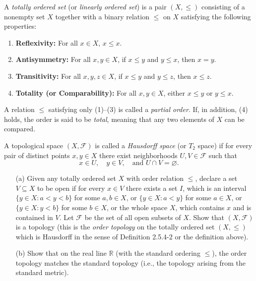 \begin{problem}[20pts]
    \vphantom{text}
    \begin{definition}\label{def:total-order}
A \emph{totally ordered set} (or \emph{linearly ordered set}) is a pair $(X, \leq)$ consisting of a nonempty set $X$ together with a binary relation $\leq$ on $X$ satisfying the following properties:
\begin{enumerate}
    \item \textbf{Reflexivity:} For all $x \in X$, $x \leq x$.
    \item \textbf{Antisymmetry:} For all $x, y \in X$, if $x \leq y$ and $y \leq x$, then $x = y$.
    \item \textbf{Transitivity:} For all $x, y, z \in X$, if $x \leq y$ and $y \leq z$, then $x \leq z$.
    \item \textbf{Totality (or Comparability):} For all $x, y \in X$, either $x \leq y$ or $y \leq x$.
\end{enumerate}
A relation $\leq$ satisfying only (1)--(3) is called a \emph{partial order}.  
If, in addition, (4) holds, the order is said to be \emph{total}, meaning that any two elements of $X$ can be compared.
\end{definition}


\begin{definition}
A topological space $(X,\mathcal{F})$ is called a \emph{Hausdorff space} (or $T_2$ space) if for every pair of distinct points $x,y \in X$ there exist neighborhoods 
$U,V \in \mathcal{F}$ such that
\[
x \in U, \quad y \in V, \quad \text{and } U \cap V = \varnothing.
\]
\end{definition}
  \begin{enumerate}
  \item[(a)] Given any totally ordered set $X$ with order relation $\le$, declare a set $V \subseteq X$ to be open if for every $x \in V$ there exists a set $I$, which is an interval  
$\{y \in X : a < y < b\}$ for some $a, b \in X$, or  
$\{y \in X : a < y\}$ for some $a \in X$, or  
$\{y \in X : y < b\}$ for some $b \in X$, or the whole space $X$, which contains $x$ and is contained in $V$.  
Let $\mathcal{F}$ be the set of all open subsets of $X$.  
Show that $(X, \mathcal{F})$ is a topology (this is the \emph{order topology} on the totally ordered set $(X, \le)$ which is Hausdorff in the sense of  Definition 2.5.4-2 or the definition above).  


\medskip
\item[(b)] 
Show that on the real line $\mathbb{R}$ (with the standard ordering $\le$), the order topology matches the standard topology (i.e., the topology arising from the standard metric).  


\end{enumerate}
\end{problem}
